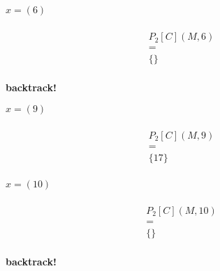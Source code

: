 \begin{minipage}[t]{8cm}
    \begin{minipage}{2.5cm}
        \centering
        \vspace{0.7mm}
        $x=(6)$
        \begin{graybox}
            \setlength{\abovedisplayskip}{0pt}
            \setlength{\belowdisplayskip}{0pt}
            \vspace{-0.5em}
            \begin{gather*}
                \\P_2[C](M,6)\\=\\\{\}\\
            \end{gather*}
        \end{graybox}
        {\large\bf backtrack!}
    \end{minipage}
    \begin{minipage}{2.5cm}
        \centering
        \vspace{0.7mm}
        $x=(9)$
        \begin{graybox}
            \setlength{\abovedisplayskip}{0pt}
            \setlength{\belowdisplayskip}{0pt}
            \vspace{-0.5em}
            \begin{gather*}
                \\P_2[C](M,9)\\=\\\{17\}\\
            \end{gather*}
        \end{graybox}
        \vspace{-0.75em}
        {\Huge{}}
    \end{minipage}
    \begin{minipage}{2.5cm}
        \centering
        \vspace{0.7mm}
        $x=(10)$
        \begin{graybox}
            \setlength{\abovedisplayskip}{0pt}
            \setlength{\belowdisplayskip}{0pt}
            \vspace{-0.5em}
            \begin{gather*}
                \\P_2[C](M,10)\\=\\\{\}\\
            \end{gather*}
        \end{graybox}
        {\large\bf backtrack!}
    \end{minipage}


\end{minipage}
